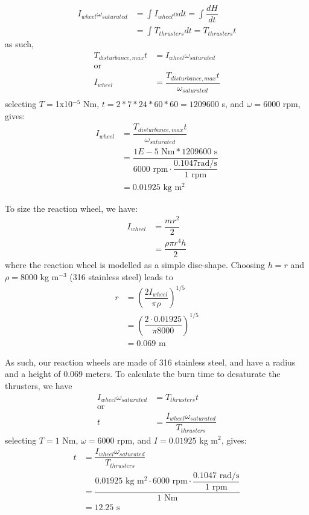 \documentclass[onecolumn,10pt]{jhwhw}
\begin{document}
\begin{align*}
I_{{wheel}} \omega_{{saturated}} & = \int I_{{wheel}} \alpha dt = \int \dfrac{dH}{dt} \\
                                 & = \int T_{{thrusters}} dt = T_{{thrusters}} t
\end{align*}
as such,
\begin{align*}
T_{{disturbance,max}}t &= I_{{wheel}} \omega_{{saturated}} \\
\mbox{or} \\
I_{{wheel}} &= \dfrac{T_{{disturbance,max}}t}{\omega_{{saturated}} }\\
\end{align*}
selecting $T =$1x10$^{-5}$ Nm, $t=2*7*24*60*60=1209600$ s, and $\omega=6000$ rpm, gives:
\begin{align*}
I_{{wheel}} &= \dfrac{T_{{disturbance,max}}t}{\omega_{{saturated}} }\\
            &= \dfrac{1E-5 \mbox{ Nm} * 1209600 \mbox{ s}}{6000\mbox{ rpm} \cdot \dfrac{0.1047\mbox{rad/s}}{1\mbox{ rpm}}} \\
            &= 0.01925 \mbox{ kg m$^2$}
\end{align*}

To size the reaction wheel, we have:
\begin{align*}
I_{{wheel}} &= \dfrac{m r^2}{2} \\
            &= \dfrac{\rho \pi r^4 h}{2}
\end{align*}
where the reaction wheel is modelled as a simple disc-shape. Choosing $h = r$ and $\rho = 8000$ kg m$^{-3}$ (316 stainless steel) leads to
\begin{align*}
r &= (\dfrac{2 I_{{wheel}}}{\pi \rho})^{1/5} \\
  &= (\dfrac{2 \cdot 0.01925}{\pi 8000})^{1/5} \\
  &= 0.069 \mbox { m}
\end{align*}

As such, our reaction wheels are made of 316 stainless steel, and have a radius and a height of 0.069 meters. To calculate the burn time to desaturate the thrusters, we have
\begin{align*}
I_{{wheel}} \omega_{{saturated}} & = T_{{thrusters}} t \\
\mbox{or} \\
t &= \dfrac{I_{{wheel}} \omega_{{saturated}}}{ T_{{thrusters}} }
\end{align*}
selecting $T =1$ Nm, $\omega=6000$ rpm, and $I=0.01925$ kg m$^2$, gives:
\begin{align*}
t &= \dfrac{I_{{wheel}} \omega_{{saturated}}}{ T_{{thrusters}} } \\
  &= \dfrac{0.01925 \mbox{ kg m$^2$} \cdot 6000\mbox{ rpm} \cdot \dfrac{0.1047\mbox{ rad/s}}{1\mbox{ rpm}}}{1 \mbox{ Nm}} \\
  &= 12.25 \mbox{ s}
\end{align*}
\end{document}
